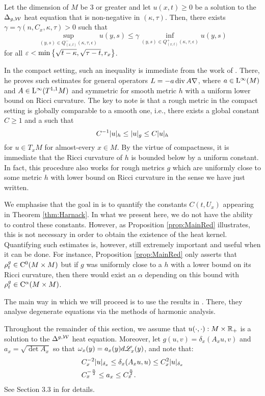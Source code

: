 \documentclass[a4paper, 12pt]{amsart}
\begin{document}
\begin{thm}
\label{thm:Harnack}
Let the dimension of $M$ be $3$ or greater 
and let $u(x,t) \geq 0$ be a 
solution to the $\Delta_{g,\mathcal{W}}$ heat equation 
that is non-negative in $(\kappa, \tau)$. 
Then, there exists $\gamma = \gamma(n, C_x, \kappa, \tau) > 0$ such that 
$$ \sup_{(y,s) \in Q^-_{(x,t)}(\kappa, \tau,\epsilon)} u(y, s) 
	\leq \gamma \inf_{(y,s) \in Q^+_{(x,t)}(\kappa,\tau,\epsilon)} u(y,s)$$
for all $\varepsilon < \min\left\{ \sqrt{t - \kappa}, \sqrt{\tau - t}, r_x\right\}$.
\end{thm} 

In the compact setting, such an inequality 
is immediate from the work of \cite{SC}. There, 
he proves such estimates for general operators
$L = -a \operatorname{div} A \nabla$, where $a \in {\rm L}^{\infty}_{\rm {}}(M)$
and $A \in {\rm L}^{\infty}_{\rm {}}(T^{1,1}M)$ and symmetric
for smooth metric $h$ with a uniform lower bound
on Ricci curvature.
The key to note is that a rough metric in the 
compact setting is globally comparable to a smooth one, 
i.e., there exists a global constant $C \geq 1$ 
and a 
such that
$$ C^{-1} |u|_{h} \leq |u|_g \leq C |u|_{h}$$
for $u \in T_x M$ for almost-every $x \in M$.
By the virtue of compactness, it is immediate
that the Ricci curvature of $h$ is bounded below
by a uniform constant. 
In fact, this procedure also works 
for rough metrics $g$ which 
are uniformly close to some metric $h$ with 
lower bound on Ricci curvature in the sense
we have just written.

We emphasise that the goal in \cite{SC}
is to quantify the constants $C(t,U_x)$
appearing in Theorem \ref{thm:Harnack}. In what we present here, we do not have
the ability to control these constants. However, as
Proposition \ref{prop:MainRed} illustrates, this is not necessary 
in order to obtain the existence of the heat kernel.
Quantifying such estimates is, however, still 
extremely important and useful when it can be done.
For instance, Proposition \ref{prop:MainRed} 
only asserts that $\rho^{g}_t \in {\rm C}^{0}_{\rm {}}(M \times M)$
but if $g$ was uniformly close to a $h$
with a lower bound on its Ricci curvature, then
there would exist an $\alpha$ depending on this bound
with $\rho^{g}_t \in {\rm C}^{\alpha}_{\rm {}}(M \times M)$.

The main way in which we will proceed is to use the
results in \cite{CS}. There, they analyse
degenerate equations via the methods of harmonic analysis.

Throughout the remainder of this section,
we assume that $u(\cdot, \cdot): M \times \mathbb{R}_+$ 
is a solution to the $\Delta^{g,\mathcal{W}}$ heat equation.
Moreover, let $g(u,v) = \delta_x(A_x u,v)$
and $a_x = \sqrt{\det A_x}$ so that
$\omega_x(y) = a_x(y)d\mathscr{L}^{{}}_x(y)$, and note
that:
\begin{equation}
\label{eq:constbd}
\begin{split}
&C_x^{-2} |u|_{\delta_x} \leq \delta_x(A_x u, u) \leq C_x^2 |u|_{\delta_x} \\
&C_x^{-\frac{n}{2}} \leq a_x \leq C_x^{\frac{n}{2}}.
\end{split}
\end{equation}
See Section 3.3 in \cite{BRough} for details. 
\end{document}
